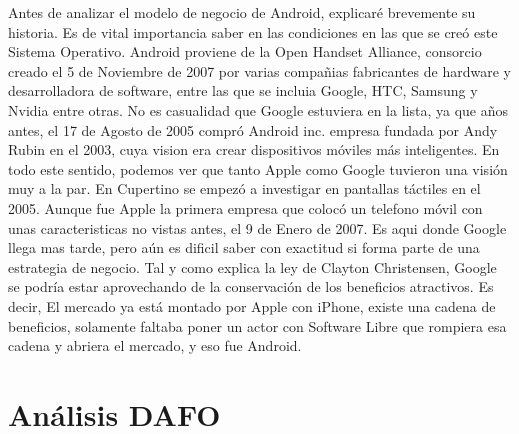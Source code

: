 \documentclass[11pt]{article}
\begin{document}
Antes de analizar el modelo de negocio de Android, explicaré brevemente su historia. Es de vital importancia saber en las condiciones en las que se creó este Sistema Operativo. Android proviene de la Open Handset Alliance, consorcio creado  el 5 de Noviembre de 2007 por varias compañias fabricantes de hardware y desarrolladora de software, entre las que se incluia Google, HTC, Samsung y Nvidia entre otras. No es casualidad que Google estuviera en la lista, ya que años antes, el 17 de Agosto de 2005 compró Android inc. empresa fundada por Andy Rubin en el 2003, cuya vision era crear dispositivos móviles más inteligentes.
En todo este sentido, podemos ver que tanto Apple como Google tuvieron una visión muy a la par. En Cupertino se empezó a investigar en pantallas táctiles en el 2005. Aunque fue Apple la primera empresa que colocó un telefono móvil con unas caracteristicas no vistas antes, el 9 de Enero de 2007. 
Es aqui donde Google llega mas tarde, pero aún es dificil saber con exactitud si forma parte de una estrategia de negocio. Tal y como explica la ley de Clayton Christensen, Google se podría estar aprovechando de la conservación de los beneficios atractivos. Es decir, El mercado ya está montado por Apple con iPhone, existe una cadena de beneficios, solamente faltaba poner un actor con Software Libre que rompiera esa cadena y abriera el mercado, y eso fue Android.

\newpage

\section{Análisis DAFO}
\end{document}
